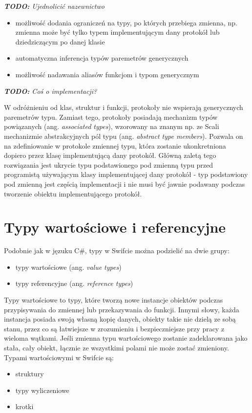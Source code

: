 \documentclass[mgr, shortabstract]{iithesis}
\newcommand{\todo}[1]{
  \textit{\textbf{TODO: }#1}
}
\newcommand{\ang}[1]{ang. \textit{#1}}
\begin{document}
\todo{Ujednolicić nazewnictwo}
\begin{itemize}
  \item możliwość dodania ograniczeń na typy, po których przebiega zmienna, np. zmienna może być tylko typem implementującym dany protokół lub dziedziczącym po danej klasie
  \item automatyczna inferencja typów paremetrów generycznych
  \item możliwość nadawania aliasów funkcjom i typom generycznym
\end{itemize}
\todo{Coś o implementacji?}

W odróżnieniu od klas, struktur i funkcji, protokoły nie wspierają generycznych paremetrów typu. Zamiast tego, protokoły posiadają mechanizm typów powiązanych (\ang{associated types}), wzorowany na znanym np. ze Scali mechanizmie abstrakcyjnych pól typu (\ang{abstract type members}). Pozwala on na zdefiniowanie w protokole zmiennej typu, która zostanie ukonkretniona dopiero przez klasę implementującą dany protokół. Główną zaletą tego rozwiązania jest ukrycie typu podstawionego pod zmienną typu przed programistą używającym klasy implementującej dany protokół - typ podstawiony pod zmienną jest częścią implementacji i nie musi być jawnie podawany podczas tworzenie obiektu implementującego protokół.

\section{Typy wartościowe i referencyjne}

Podobnie jak w jęzuku C#, typy w Swifcie można podzielić na dwie grupy:

\begin{itemize}
    \item typy wartościowe (\ang{value types})
    \item typy referencyjne (\ang{reference types})
\end{itemize}

Typy wartościowe to typy, które tworzą nowe instancje obiektów podczas przypisywania do zmiennej lub przekazywania do funkcji. Innymi słowy, każda instancja posiada swoją własną kopię danych, obiekty takie nie dzielą ze sobą stanu, przez co są łatwiejsze w zrozumieniu i bezpieczniejsze przy pracy z wieloma wątkami. Jeśli zmienna typu wartościowego zostanie zadeklarowana jako stała, cały obiekt, łącznie ze wszystkimi polami nie może zostać zmieniony. Typami wartościowymi w Swifcie są:

\begin{itemize}
    \item struktury
    \item typy wyliczeniowe
    \item krotki
\end{itemize}
\end{document}
